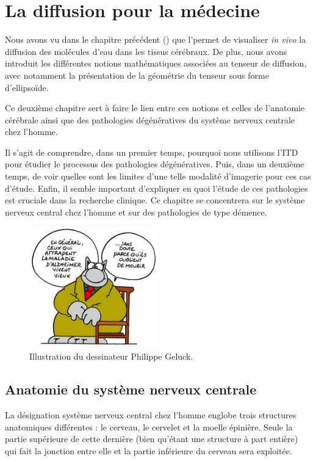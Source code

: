 

\chapter{La diffusion pour la médecine}
\label{Chapter2}

Nous avons vu dans le chapitre précédent () que l'\itd permet de visualiser \textit{in vivo}
la diffusion des molécules d'eau dans les tissus cérébraux.
De plus, nous avons introduit les différentes notions mathématiques associées au tenseur de diffusion,
avec notamment la présentation de la géométrie du tenseur sous forme d'ellipsoïde.

Ce deuxième chapitre sert à faire le lien entre ces notions et celles de l'anatomie cérébrale 
ainsi que des pathologies dégénératives du système nerveux centrale chez l'homme.

Il s'agit de comprendre, dans un premier temps, pourquoi nous utilisons l'ITD
pour étudier le processus des pathologies dégénératives.
Puis, dans un deuxième temps, de voir quelles sont les limites d'une telle modalité d'imagerie pour ces cas d'étude.
Enfin, il semble important d'expliquer en quoi l'étude de ces pathologies est cruciale dans la recherche clinique.
Ce chapitre se concentrera sur le système nerveux central chez l'homme et sur des pathologies de type démence.

\begin{figure}[h]
    \centering
    \includegraphics[width=0.5\textwidth]{Images/lechat.jpg}
    \caption{\label{fig:lechat} Illustration du dessinateur Philippe Geluck.}
\end{figure}


\section{Anatomie du système nerveux centrale}
La désignation \og système nerveux central chez l'homme \fg englobe trois structures anatomiques différentes : 
le cerveau, le cervelet et la moelle épinière.
Seule la partie supérieure de cette dernière (bien qu'étant une structure à part entière) 
qui fait la jonction entre elle et la partie inférieure du cerveau sera exploitée.

